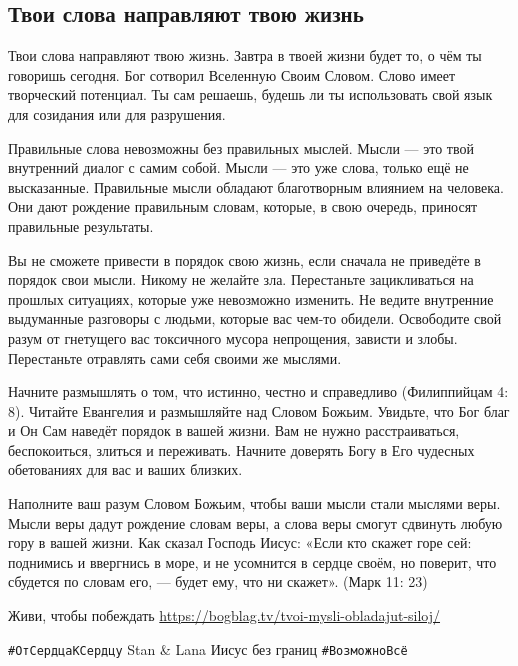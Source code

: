  
 
 
 
 

\subsection{Твои слова направляют твою жизнь}
\label{sec:07_08_2020.fb.valen_valentina.1.slova_zhizn}

Твои слова направляют твою жизнь. Завтра в твоей жизни будет то, о чём ты
говоришь сегодня. Бог сотворил Вселенную Своим Словом. Слово имеет творческий
потенциал. Ты сам решаешь, будешь ли ты использовать свой язык для созидания
или для разрушения.

Правильные слова невозможны без правильных мыслей. Мысли — это твой внутренний
диалог с самим собой. Мысли — это уже слова, только ещё не высказанные.
Правильные мысли обладают благотворным влиянием на человека. Они дают рождение
правильным словам, которые, в свою очередь, приносят правильные результаты.

Вы не сможете привести в порядок свою жизнь, если сначала не приведёте в
порядок свои мысли. Никому не желайте зла. Перестаньте зацикливаться на прошлых
ситуациях, которые уже невозможно изменить. Не ведите внутренние выдуманные
разговоры с людьми, которые вас чем-то обидели. Освободите свой разум от
гнетущего вас токсичного мусора непрощения, зависти и злобы. Перестаньте
отравлять сами себя своими же мыслями.

Начните размышлять о том, что истинно, честно и справедливо (Филиппийцам 4: 8).
Читайте Евангелия и размышляйте над Словом Божьим. Увидьте, что Бог благ и Он
Сам наведёт порядок в вашей жизни. Вам не нужно расстраиваться, беспокоиться,
злиться и переживать. Начните доверять Богу в Его чудесных обетованиях для вас
и ваших близких.

Наполните ваш разум Словом Божьим, чтобы ваши мысли стали мыслями веры. Мысли
веры дадут рождение словам веры, а слова веры смогут сдвинуть любую гору в
вашей жизни. Как сказал Господь Иисус: «Если кто скажет горе сей: поднимись и
ввергнись в море, и не усомнится в сердце своём, но поверит, что сбудется по
словам его, — будет ему, что ни скажет». (Марк 11: 23)

Живи, чтобы побеждать \url{https://bogblag.tv/tvoi-mysli-obladajut-siloj/}

\verb|#ОтСердцаКСердцу| Stan \& Lana Иисус без границ \verb|#ВозможноВсё|
